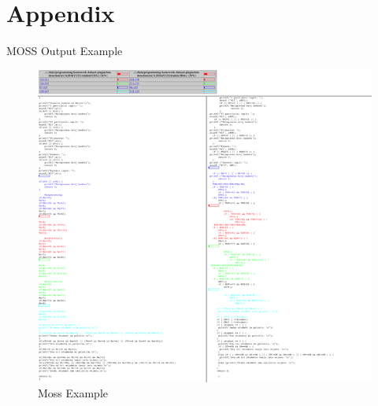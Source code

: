 \documentclass[twocolumn]{article}
\begin{document}



\newpage
\onecolumn
\section{Appendix}
\appendix
MOSS Output Example
\label{appendix:raw}
\begin{figure}[h]
\centering
\caption{Moss Example}
\centering
\includegraphics[scale=0.8]{images/MossExample.png}
\end{figure}
\end{document}
